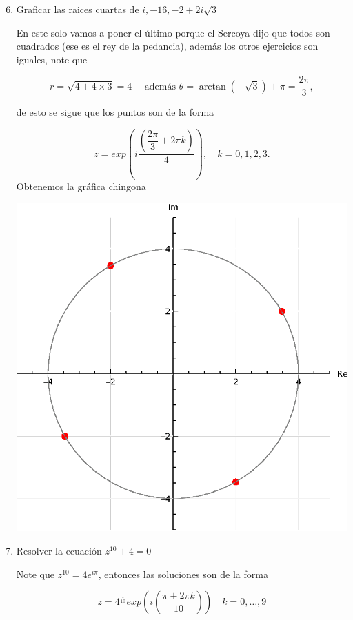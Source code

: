 \documentclass[11pt]{article}
\begin{document}
\begin{enumerate}
  \setcounter{enumi}{5}
  \item Graficar las raices cuartas de $i,-16,-2+2 i \sqrt{3}$

En este solo vamos a poner el último porque el Sercoya dijo que todos son cuadrados (ese es el rey de la pedancia), además los otros ejercicios son iguales, note que

$$r=\sqrt{4+4\times 3}=4 \quad \text{ además } \theta=\arctan\left(-\sqrt{3}\right) +\pi=\frac{2\pi}{3},$$

de esto se sigue que los puntos son de la forma

$$z=exp\left(i\frac{\left(\dfrac{2\pi}{3}+2\pi k\right)}{4}\right) , \quad k=0,1,2,3.$$
Obtenemos la gráfica chingona 

\begin{center}
\includegraphics[scale=0.8]{Graphics/Punto6.eps}
\end{center}

  \item Resolver la ecuación $z^{10}+4=0$

Note que $z^{10}=4e^{i\pi}$, entonces las soluciones son de la forma 

$$z=4^{\frac{1}{10}}exp\left(i\left(\displaystyle\frac{\pi+2\pi k}{10}\right)\right) \quad k=0,\ldots,9$$


\end{enumerate}
\end{document}
